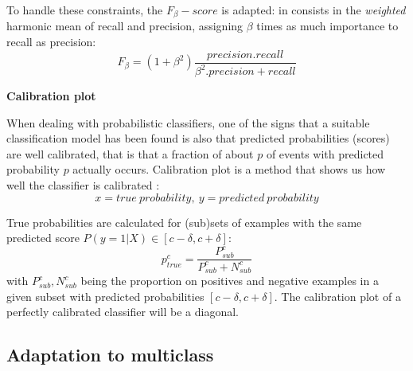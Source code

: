 To handle these constraints, the $F_\beta-score$ is adapted: in consists in the \textit{weighted} harmonic mean of recall and precision, assigning $\beta$ times as much importance to recall as precision: $$F_\beta = (1+\beta^2) \frac{precision.recall}{\beta^2.precision+recall}$$

\textbf{Calibration plot} 

When dealing with probabilistic classifiers, one of the signs that a suitable classification model has been found is also that predicted probabilities (scores) are well calibrated, that is that a fraction of about $p$ of events with predicted probability $p$ actually occurs. Calibration plot is a method that shows us how well the classifier is calibrated \cite{Calibration}: $$x = true\ probability,\ y=predicted\ probability$$

True probabilities are calculated for (sub)sets of examples with the same predicted score $P(y=1|X) \in [c-\delta, c+\delta]$: $$ p_{true}^c = \frac{P_{sub}^c}{P_{sub}^c + N_{sub}^c}$$ with $P_{sub}^c, N_{sub}^c$ being the proportion on positives and negative examples in a given subset with predicted probabilities $[c-\delta, c+\delta]$. The calibration plot of a perfectly calibrated classifier will be a diagonal.


\subsection{Adaptation to multiclass}